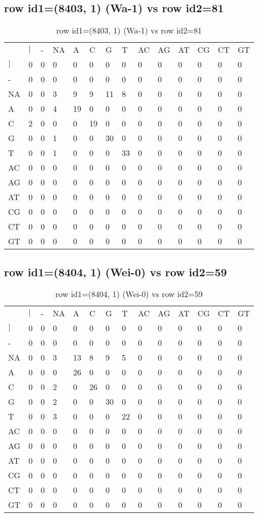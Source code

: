 \subsection{row id1=(8403, 1) (Wa-1) vs row id2=81}
\begin{center}
\begin{longtable}{|l|l|l|l|l|l|l|l|l|l|l|l|l|l|}
\caption{row id1=(8403, 1) (Wa-1) vs row id2=81} \label{table_dm474}\\
\hline
\\
\hline
&$|$&-&NA&A&C&G&T&AC&AG&AT&CG&CT&GT\\
$|$&0&0&0&0&0&0&0&0&0&0&0&0&0\\
-&0&0&0&0&0&0&0&0&0&0&0&0&0\\
NA&0&0&3&9&9&11&8&0&0&0&0&0&0\\
A&0&0&4&19&0&0&0&0&0&0&0&0&0\\
C&2&0&0&0&19&0&0&0&0&0&0&0&0\\
G&0&0&1&0&0&30&0&0&0&0&0&0&0\\
T&0&0&1&0&0&0&33&0&0&0&0&0&0\\
AC&0&0&0&0&0&0&0&0&0&0&0&0&0\\
AG&0&0&0&0&0&0&0&0&0&0&0&0&0\\
AT&0&0&0&0&0&0&0&0&0&0&0&0&0\\
CG&0&0&0&0&0&0&0&0&0&0&0&0&0\\
CT&0&0&0&0&0&0&0&0&0&0&0&0&0\\
GT&0&0&0&0&0&0&0&0&0&0&0&0&0\\
\hline
\end{longtable}
\end{center}

\subsection{row id1=(8404, 1) (Wei-0) vs row id2=59}
\begin{center}
\begin{longtable}{|l|l|l|l|l|l|l|l|l|l|l|l|l|l|}
\caption{row id1=(8404, 1) (Wei-0) vs row id2=59} \label{table_dm476}\\
\hline
\\
\hline
&$|$&-&NA&A&C&G&T&AC&AG&AT&CG&CT&GT\\
$|$&0&0&0&0&0&0&0&0&0&0&0&0&0\\
-&0&0&0&0&0&0&0&0&0&0&0&0&0\\
NA&0&0&3&13&8&9&5&0&0&0&0&0&0\\
A&0&0&0&26&0&0&0&0&0&0&0&0&0\\
C&0&0&2&0&26&0&0&0&0&0&0&0&0\\
G&0&0&2&0&0&30&0&0&0&0&0&0&0\\
T&0&0&3&0&0&0&22&0&0&0&0&0&0\\
AC&0&0&0&0&0&0&0&0&0&0&0&0&0\\
AG&0&0&0&0&0&0&0&0&0&0&0&0&0\\
AT&0&0&0&0&0&0&0&0&0&0&0&0&0\\
CG&0&0&0&0&0&0&0&0&0&0&0&0&0\\
CT&0&0&0&0&0&0&0&0&0&0&0&0&0\\
GT&0&0&0&0&0&0&0&0&0&0&0&0&0\\
\hline
\end{longtable}
\end{center}

